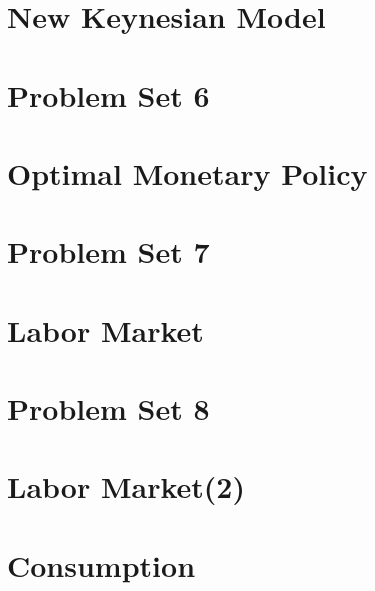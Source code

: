 \documentclass[a4paper, 11pt]{report}
\begin{document}
\chapter{New Keynesian Model}

\chapter{Problem Set 6}

\chapter{Optimal Monetary Policy}

\chapter{Problem Set 7}

\chapter{Labor Market}

\chapter{Problem Set 8}

\chapter{Labor Market(2)}

\chapter{Consumption}




\end{document}
